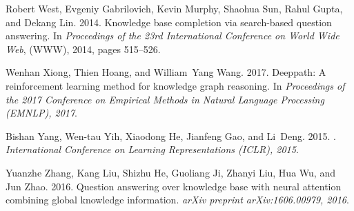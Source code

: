 \documentclass[11pt,a4paper]{article}
\begin{document}
\begin{thebibliography}{29}
Robert West, Evgeniy Gabrilovich, Kevin Murphy, Shaohua Sun, Rahul Gupta, and
  Dekang Lin. 2014.
\newblock Knowledge base completion via search-based question answering.
\newblock In \emph{Proceedings of the 23rd International Conference on World
  Wide Web}, (WWW), 2014, pages 515--526.

Wenhan Xiong, Thien Hoang, and William~Yang Wang. 2017.
\newblock Deeppath: A reinforcement learning method for knowledge graph
  reasoning.
\newblock In \emph{Proceedings of the 2017 Conference on Empirical Methods in
  Natural Language Processing (EMNLP), 2017}.

Bishan Yang, Wen-tau Yih, Xiaodong He, Jianfeng Gao, and Li~Deng. 2015.
.
\newblock \emph{International Conference on Learning Representations (ICLR),
  2015}.

Yuanzhe Zhang, Kang Liu, Shizhu He, Guoliang Ji, Zhanyi Liu, Hua Wu, and Jun
  Zhao. 2016.
\newblock Question answering over knowledge base with neural attention
  combining global knowledge information.
\newblock \emph{arXiv preprint arXiv:1606.00979, 2016}.

\end{thebibliography}
\end{document}
